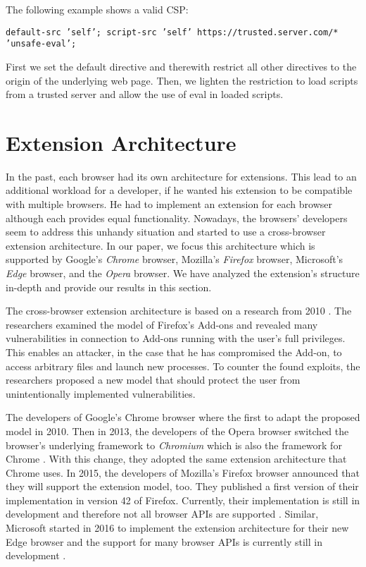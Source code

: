 	The following example shows a valid CSP:
	\begin{center}
		\texttt{default-src 'self'; script-src 'self' https://trusted.server.com/* 'unsafe-eval';}
	\end{center}
	First we set the default directive and therewith restrict all other directives to the origin of the underlying web page. Then, we lighten the restriction to load scripts from a trusted server and allow the use of eval in loaded scripts.



\newpage
\section{Extension Architecture}

	In the past, each browser had its own architecture for extensions. This lead to an additional workload for a developer, if he wanted his extension to be compatible with multiple browsers. He had to implement an extension for each browser although each provides equal functionality. Nowadays, the browsers' developers seem to address this unhandy situation and started to use a cross-browser extension architecture. In our paper, we focus this architecture which is supported by Google's \textit{Chrome} browser, Mozilla's \textit{Firefox} browser, Microsoft's \textit{Edge} browser, and the \textit{Opera} browser. We have analyzed the extension's structure in-depth and provide our results in this section.

	The cross-browser extension architecture is based on a research from 2010 \cite{Barth10protectingbrowsers}. The researchers examined the model of Firefox's Add-ons and revealed many vulnerabilities in connection to Add-ons running with the user's full privileges. This enables an attacker, in the case that he has compromised the Add-on, to access arbitrary files and launch new processes. To counter the found exploits, the researchers proposed a new model that should protect the user from unintentionally implemented vulnerabilities.

	The developers of Google's Chrome browser where the first to adapt the proposed model in 2010. Then in 2013, the developers of the Opera browser switched the browser's underlying framework to \textit{Chromium} which is also the framework for Chrome \cite{operaBlogSwitchToChromium}. With this change, they adopted the same extension architecture that Chrome uses. In 2015, the developers of Mozilla's Firefox browser announced that they will support the extension model, too. They published a first version of their implementation in version 42 of Firefox. Currently, their implementation is still in development and therefore not all browser APIs are supported \cite{mozillaWebExtensionStatus}. Similar, Microsoft started in 2016 to implement the extension architecture for their new Edge browser and the support for many browser APIs is currently still in development \cite{edgeBrowserApiStatus}.

